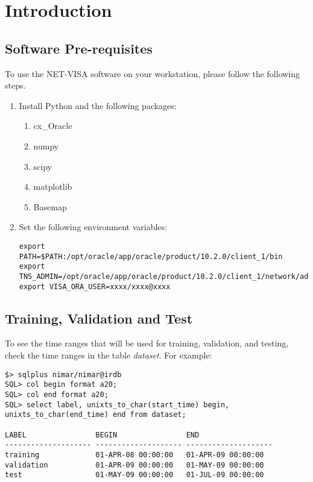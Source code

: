 

\chapter{Introduction}


\section{Software Pre-requisites}
To use the NET-VISA software on your workstation, please follow the
following steps.

\begin{enumerate}
\item Install Python and the following packages:
\begin{enumerate}
\item cx\_Oracle
\item numpy
\item scipy
\item matplotlib
\item Basemap
\end{enumerate}
\item Set the following environment variables:
{\footnotesize
\begin{verbatim}
export PATH=$PATH:/opt/oracle/app/oracle/product/10.2.0/client_1/bin
export TNS_ADMIN=/opt/oracle/app/oracle/product/10.2.0/client_1/network/admin
export VISA_ORA_USER=xxxx/xxxx@xxxx
\end{verbatim}
}
\end{enumerate}

\section{Training, Validation and Test}

To see the time ranges that will be used for training, validation, and
testing, check the time ranges in the table {\em dataset}. For example:
\begin{verbatim}
$> sqlplus nimar/nimar@irdb
SQL> col begin format a20;
SQL> col end format a20;
SQL> select label, unixts_to_char(start_time) begin,
unixts_to_char(end_time) end from dataset;

LABEL                BEGIN                END
-------------------- -------------------- --------------------
training             01-APR-08 00:00:00   01-APR-09 00:00:00
validation           01-APR-09 00:00:00   01-MAY-09 00:00:00
test                 01-MAY-09 00:00:00   01-JUL-09 00:00:00

\end{verbatim}


